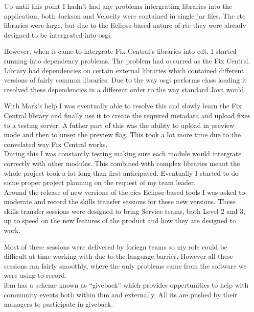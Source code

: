 \documentclass[a4paper,11pt]{report}
\begin{document}
Up until this point I hadn't had any problems intergrating libraries into the application, both
Jackson and Velocity were contained in single jar files. The \gls{rtc} libraries were large, but
due to the Eclipse-based nature of \gls{rtc} they were already designed to be intergrated into 
\gls{osgi}.

However, when it came to intergrate Fix Central's libraries into \gls{edt}, I started running into
dependency problems. The problem had occurred as the Fix Central Library had dependencies on
certain external libraries which contained different versions of fairly common libraries. Due to
the way \gls{osgi} performs class loading it resolved these dependencies in a different order to
the way standard Java would.

With Mark's help I was eventually able to resolve this and slowly learn the Fix Central library and
finally use it to create the required metadata and upload fixes to a testing server. A futher part
of this was the ability to upload in preview mode and then to unset the preview flag. This took a
lot more time due to the convelated way Fix Central works. \\

During this I was constantly testing making sure each module would intergrate correctly with other
modules. This combined with complex libraries meant the whole project took a lot long than first
anticipated. Eventually I started to do some proper project planning on the request of my team 
leader. \\



Around the release of new versions of the \gls{cics} Eclipse-based tools I was asked to moderate
and record the skills transfer sessions for these new versions. These skills transfer sessions were
designed to bring Service teams, both Level 2 and 3, up to speed on the new features of the product
and how they are designed to work.

Most of these sessions were delivered by foriegn teams so my role could be difficult at time
working with due to the language barrier. However all these sessions ran fairly smoothly, where
the only problems came from the software we were using to record. \\



\gls{ibm} has a scheme known as ``giveback'' which provides oppertunities to help with community
events both within \gls{ibm} and externally. All \gls{it}s are pushed by their managers to 
participate in giveback.
\end{document}
